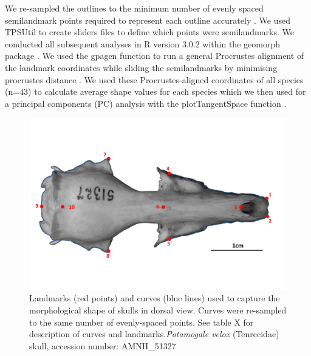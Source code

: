 \documentclass[12pt,a4paper]{article}
\begin{document}
	We re-sampled the outlines to the minimum number of evenly spaced semilandmark points required to represent each outline accurately \citep[][details in supplementary material]{MacLeod2013}. We used TPSUtil \citep{Rohlf2012} to create sliders files \citep{Zelditch2012} to define which points were semilandmarks. We conducted all subsequent analyses in R version 3.0.2 \citep[R Development Core][]{Team2013} within the geomorph package \citep{Adams2013}. We used the gpagen function to run a general Procrustes alignment \citep{Rohlf1993} of the landmark coordinates while sliding the semilandmarks by minimising procrustes distance \citep{Bookstein1997}. We used these Procrustes-aligned coordinates of all species (n=43) to calculate average shape values for each species which we then used for a principal components (PC) analysis with the plotTangentSpace function \citep{Adams2013}. 

	\begin{figure}
	\centering
	\includegraphics[width=1\linewidth]{figures/AMNH_51327_dorsallandmarksdiagram.png}
	\caption{Landmarks (red points) and curves (blue lines) used to capture the morphological shape of skulls in dorsal view. Curves were re-sampled to the same number of evenly-spaced points. See table X for description of curves and landmarks.\textit{Potamogale velox} (Tenrecidae) skull, accession number: AMNH\_51327}
	\label{fig:skdors_landmarks}
	\end{figure}
\end{document}
